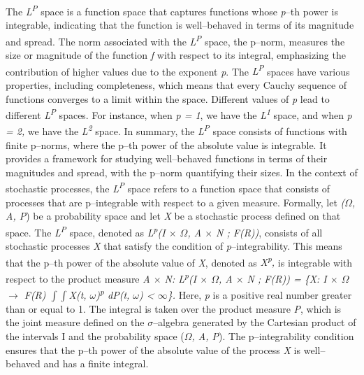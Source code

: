 \documentclass[12pt,a4paper]{report}
\numberwithin{equation}{section}
\begin{document}
The \emph{L\textsuperscript{P}} space is a function space that captures
functions whose \emph{p}--th power is integrable, indicating that the
function is well--behaved in terms of its magnitude and spread. The norm
associated with the \emph{L\textsuperscript{P}} space, the p--norm,
measures the size or magnitude of the function \emph{f} with respect to
its integral, emphasizing the contribution of higher values due to the
exponent \emph{p}. The \emph{L\textsuperscript{P}} spaces have various
properties, including completeness, which means that every Cauchy
sequence of functions converges to a limit within the space. Different
values of \emph{p} lead to different \emph{L\textsuperscript{P}} spaces.
For instance, when \emph{p = 1}, we have the \emph{L\textsuperscript{1}}
space, and when \emph{p = 2,} we have the \emph{L\textsuperscript{2}}
space. In summary, the \emph{L\textsuperscript{P}} space consists of
functions with finite p--norms, where the p--th power of the absolute
value is integrable. It provides a framework for studying well--behaved
functions in terms of their magnitudes and spread, with the p--norm
quantifying their sizes. In the context of stochastic processes, the
\emph{L\textsuperscript{P}} space refers to a function space that
consists of processes that are p--integrable with respect to a given
measure. Formally, let \emph{($\Omega$, A, P}) be a probability space and let
\emph{X} be a stochastic process defined on that space. The
\emph{L\textsuperscript{P}} space, denoted as
\emph{L\textsuperscript{p}(I $\times$ $\Omega$, A $\times$ N ; F(R))}, consists of all
stochastic processes \emph{X} that satisfy the condition of
\emph{p}--integrability. This means that the p--th power of the absolute
value of \emph{X}, denoted as
\emph{\textbar X\textbar{}\textsuperscript{p},} is integrable with
respect to the product measure \emph{A $\times$ N: L\textsuperscript{p}(I $\times$ $\Omega$,
A $\times$ N ; F(R)) = \{X: I $\times$ $\Omega$ $\rightarrow$ F(R) \textbar{} $\int$$\int$\textbar X(t,
$\omega$)\textbar{}\textsuperscript{p} dP(t, $\omega$) \textless{} $\infty$\}.} Here,
\emph{p} is a positive real number greater than or equal to 1. The
integral is taken over the product measure \emph{P}, which is the joint
measure defined on the $\sigma$--algebra generated by the Cartesian product of
the intervals I and the probability space (\emph{$\Omega$, A, P}). The
p--integrability condition ensures that the p--th power of the absolute
value of the process \emph{X} is well--behaved and has a finite integral.
\end{document}
